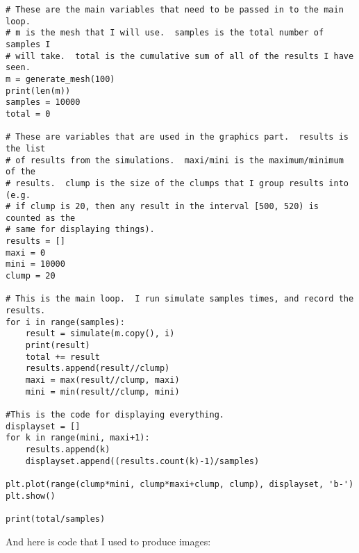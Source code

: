 \documentclass[11pt]{article}
\theoremstyle{definition}
\begin{document}
\begin{verbatim}
# These are the main variables that need to be passed in to the main loop.
# m is the mesh that I will use.  samples is the total number of samples I
# will take.  total is the cumulative sum of all of the results I have seen.
m = generate_mesh(100)
print(len(m))
samples = 10000
total = 0

# These are variables that are used in the graphics part.  results is the list
# of results from the simulations.  maxi/mini is the maximum/minimum of the
# results.  clump is the size of the clumps that I group results into (e.g.
# if clump is 20, then any result in the interval [500, 520) is counted as the
# same for displaying things).
results = []
maxi = 0
mini = 10000
clump = 20

# This is the main loop.  I run simulate samples times, and record the results.
for i in range(samples):
    result = simulate(m.copy(), i)
    print(result)
    total += result
    results.append(result//clump)
    maxi = max(result//clump, maxi)
    mini = min(result//clump, mini)

#This is the code for displaying everything.
displayset = []
for k in range(mini, maxi+1):
    results.append(k)
    displayset.append((results.count(k)-1)/samples)

plt.plot(range(clump*mini, clump*maxi+clump, clump), displayset, 'b-')
plt.show()

print(total/samples)
\end{verbatim}
And here is code that I used to produce images:
\end{document}
